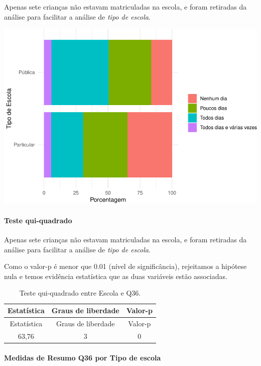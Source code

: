 \documentclass[]{article}
\let\oldparagraph\paragraph
\renewcommand{\paragraph}[1]{\oldparagraph{#1}\mbox{}}
\begin{document}
Apenas sete crianças não estavam matriculadas na escola, e foram retiradas da análise para facilitar a análise de \emph{tipo de escola}.

\begin{center}\includegraphics[width=0.75\linewidth]{relatorio_covid19_files/figure-latex/unnamed-chunk-1352-1} \end{center}

\hypertarget{teste-qui-quadrado-116}{%
\paragraph{Teste qui-quadrado}\label{teste-qui-quadrado-116}}

Apenas sete crianças não estavam matriculadas na escola, e foram retiradas da análise para facilitar a análise de \emph{tipo de escola}.

Como o valor-p é menor que 0.01 (nível de significância), rejeitamos a hipótese nula e temos evidência estatística que as duas variáveis estão associadas.

\begin{longtable}[]{@{}ccc@{}}
\caption{\label{tab:unnamed-chunk-1354}Teste qui-quadrado entre Escola e Q36.}\tabularnewline
\toprule
Estatística & Graus de liberdade & Valor-p\tabularnewline
\midrule
\endfirsthead
\toprule
Estatística & Graus de liberdade & Valor-p\tabularnewline
\midrule
\endhead
63,76 & 3 & 0\tabularnewline
\bottomrule
\end{longtable}

\cleardoublepage

\hypertarget{medidas-de-resumo-q36-por-tipo-de-escola}{%
\paragraph{Medidas de Resumo Q36 por Tipo de escola}\label{medidas-de-resumo-q36-por-tipo-de-escola}}
\end{document}
